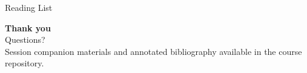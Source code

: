 \documentclass[aspectratio=169, 12pt, xcolor={dvipsnames,table}]{beamer}
\begin{document}
\begin{frame}[allowframebreaks]{Reading List}
\nocite{morris2024levels, bubeck2023sparks, trinh2024alphageometry,
        metr2024horizon, grace2024thousands, bengio2024managing,
        chollet2019measure, schaeffer2023mirage,
        yao2023react, shinn2023reflexion,
        jimenez2024swebench, mialon2024gaia,
        aisiuk2024, stanfordaiindex2024, epochai2024}


\end{frame}

\begin{frame}[plain]
\begin{center}
  \vspace*{1.5em}
  {\Huge\bfseries Thank you}\\[1.2em]
  {\Large Questions?}\\[2em]
  {\footnotesize Session companion materials and annotated bibliography available in the course repository.}
\end{center}
\end{frame}
\end{document}
